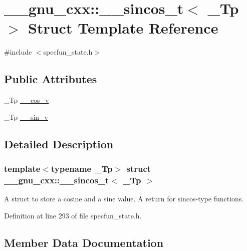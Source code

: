 \hypertarget{struct____gnu__cxx_1_1____sincos__t}{}\section{\+\_\+\+\_\+gnu\+\_\+cxx\+:\+:\+\_\+\+\_\+sincos\+\_\+t$<$ \+\_\+\+Tp $>$ Struct Template Reference}
\label{struct____gnu__cxx_1_1____sincos__t}


{\ttfamily \#include $<$specfun\+\_\+state.\+h$>$}

\subsection*{Public Attributes}
\begin{DoxyCompactItemize}
\item 
\+\_\+\+Tp \hyperlink{struct____gnu__cxx_1_1____sincos__t_ae88c123c9c9b2d138fdaa43b0c1addb6}{\+\_\+\+\_\+cos\+\_\+v}
\item 
\+\_\+\+Tp \hyperlink{struct____gnu__cxx_1_1____sincos__t_a22a21d9a5658097549cbca39b891fd27}{\+\_\+\+\_\+sin\+\_\+v}
\end{DoxyCompactItemize}


\subsection{Detailed Description}
\subsubsection*{template$<$typename \+\_\+\+Tp$>$\newline
struct \+\_\+\+\_\+gnu\+\_\+cxx\+::\+\_\+\+\_\+sincos\+\_\+t$<$ \+\_\+\+Tp $>$}

A struct to store a cosine and a sine value. A return for sincos-\/type functions. 

Definition at line 293 of file specfun\+\_\+state.\+h.



\subsection{Member Data Documentation}
\mbox{\label{struct____gnu__cxx_1_1____sincos__t_ae88c123c9c9b2d138fdaa43b0c1addb6}} 
